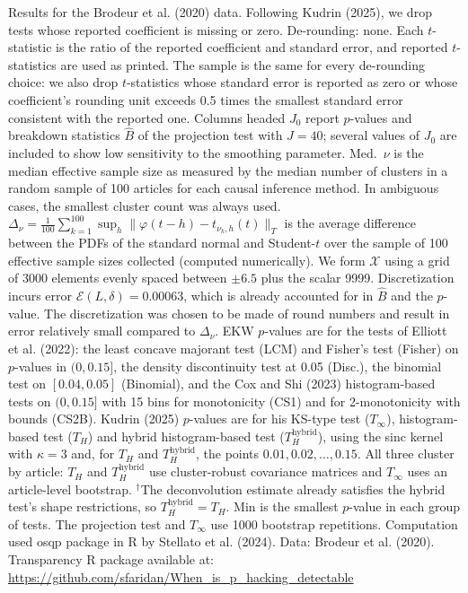 \begin{table}[htbp]
\medskip
\begin{minipage}{\linewidth}
Results for the Brodeur et al. (2020) data. Following Kudrin (2025), we drop tests whose reported coefficient is missing or zero.
De-rounding: none. Each $t$-statistic is the ratio of the reported coefficient and standard error, and reported $t$-statistics are used as printed.
The sample is the same for every de-rounding choice: we also drop $t$-statistics whose standard error is reported as zero or whose coefficient's rounding unit exceeds 0.5 times the smallest standard error consistent with the reported one.
Columns headed $J_0$ report $p$-values and breakdown statistics $\widehat{B}$ of the projection test with $J=40$; several values of $J_0$ are included to show low sensitivity to the smoothing parameter.
Med.\ $\nu$ is the median effective sample size as measured by the median number of clusters in a random sample of 100 articles for each causal inference method.
In ambiguous cases, the smallest cluster count was always used.
$\Delta_\nu=\frac{1}{100}\sum_{k=1}^{100}\sup_h\|\varphi(t-h)-t_{\nu_k,h}(t)\|_T$ is the average difference between the PDFs of the standard normal and Student-$t$ over the sample of 100 effective sample sizes collected (computed numerically).
We form $\mathcal{X}$ using a grid of 3000 elements evenly spaced between $\pm 6.5$ plus the scalar 9999.
Discretization incurs error $\mathcal{E}(L,\delta)=0.00063$, which is already accounted for in $\widehat{B}$ and the $p$-value.
The discretization was chosen to be made of round numbers and result in error relatively small compared to $\Delta_\nu$.
EKW $p$-values are for the tests of Elliott et al. (2022): the least concave majorant test (LCM) and Fisher's test (Fisher) on $p$-values in $(0,0.15]$, the density discontinuity test at 0.05 (Disc.), the binomial test on $[0.04,0.05]$ (Binomial), and the Cox and Shi (2023) histogram-based tests on $(0,0.15]$ with 15 bins for monotonicity (CS1) and for 2-monotonicity with bounds (CS2B).
Kudrin (2025) $p$-values are for his KS-type test ($T_\infty$), histogram-based test ($T_H$) and hybrid histogram-based test ($T_H^{\mathrm{hybrid}}$), using the sinc kernel with $\kappa=3$ and, for $T_H$ and $T_H^{\mathrm{hybrid}}$, the points $0.01,0.02,\ldots,0.15$.
All three cluster by article: $T_H$ and $T_H^{\mathrm{hybrid}}$ use cluster-robust covariance matrices and $T_\infty$ uses an article-level bootstrap.
$^\dagger$The deconvolution estimate already satisfies the hybrid test's shape restrictions, so $T_H^{\mathrm{hybrid}}=T_H$.
Min is the smallest $p$-value in each group of tests.
The projection test and $T_\infty$ use 1000 bootstrap repetitions.
Computation used osqp package in R by Stellato et al. (2024). Data: Brodeur et al. (2020).
Transparency R package available at: \url{https://github.com/sfaridan/When_is_p_hacking_detectable}
\end{minipage}
\end{table}
